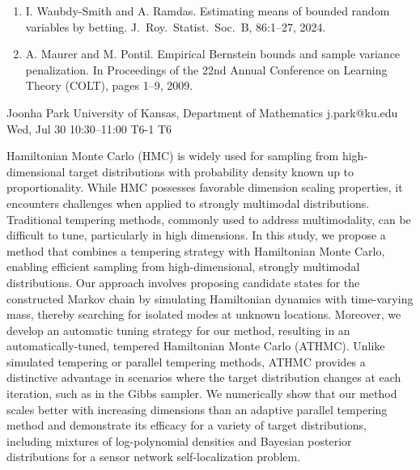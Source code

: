 \documentclass[12pt,lettersize,oneside]{book} %
\begin{document}
\begin{talk}
\begin{enumerate}
 \item[{[1]}] I. Waubdy-Smith and A. Ramdas. Estimating means of bounded random
variables by betting. J.\ Roy.\ Statist.\ Soc.\ B, 86:1--27, 2024.
 \item[{[2]}] A. Maurer and M. Pontil. Empirical Bernstein bounds and sample variance penalization. In Proceedings of the 22nd Annual Conference
on Learning Theory (COLT), pages 1--9, 2009.
\end{enumerate}


\end{talk}

\begin{talk}
  {Joonha Park}%
  {University of Kansas, Department of Mathematics}%
  {j.park@ku.edu}%
  {}%
  {}%
  {}%
  {Wed, Jul 30 10:30--11:00}%
  {T6-1}%
  {T6}%
  {}%
  
    

Hamiltonian Monte Carlo (HMC) is widely used for sampling from high-dimensional target distributions with probability density known up to proportionality. While HMC possesses favorable dimension scaling properties, it encounters challenges when applied to strongly multimodal distributions. Traditional tempering methods, commonly used to address multimodality, can be diﬃcult to tune, particularly in high dimensions. In this study, we propose a method that combines a tempering strategy with Hamiltonian Monte Carlo, enabling eﬃcient sampling from high-dimensional, strongly multimodal distributions. Our approach involves proposing candidate states for the constructed Markov chain by simulating Hamiltonian dynamics with time-varying mass, thereby searching for isolated modes at unknown locations. Moreover, we develop an automatic tuning strategy for our method, resulting in an automatically-tuned, tempered Hamiltonian Monte Carlo (ATHMC). Unlike simulated tempering or parallel tempering methods, ATHMC provides a distinctive advantage in scenarios where the target distribution changes at each iteration, such as in the Gibbs sampler. We numerically show that our method scales better with increasing dimensions than an adaptive parallel tempering method and demonstrate its eﬃcacy for a variety of target distributions, including mixtures of log-polynomial densities and Bayesian posterior distributions for a sensor network self-localization problem.
   
\end{talk}
\end{document}
